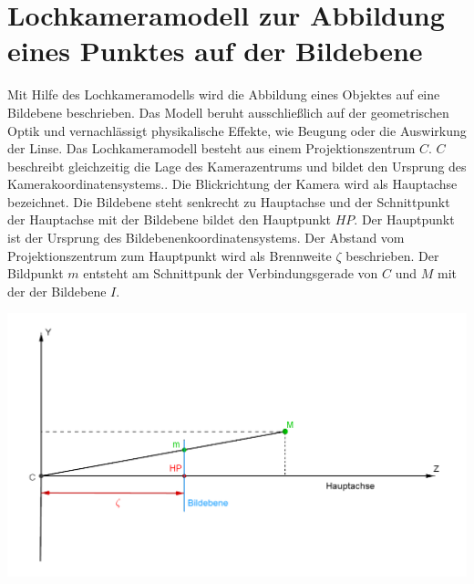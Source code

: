 \section{Lochkameramodell zur Abbildung eines Punktes auf der Bildebene}

Mit Hilfe des Lochkameramodells wird die Abbildung eines Objektes auf eine Bildebene beschrieben. Das Modell beruht ausschließlich auf der geometrischen Optik und vernachlässigt physikalische Effekte, wie Beugung oder die Auswirkung der Linse\cite{Heipke}. Das Lochkameramodell besteht aus einem Projektionszentrum $C$. $C$ beschreibt gleichzeitig die Lage des Kamerazentrums und bildet den Ursprung des Kamerakoordinatensystems.\cite{CamerModels.,HZ}.
Die Blickrichtung der Kamera wird als Hauptachse bezeichnet. Die Bildebene steht senkrecht zu Hauptachse und der Schnittpunkt der Hauptachse mit der Bildebene bildet den Hauptpunkt $HP$. Der Hauptpunkt ist der Ursprung des Bildebenenkoordinatensystems. Der Abstand vom Projektionszentrum zum Hauptpunkt wird als Brennweite $\zeta$ beschrieben\cite{HZ,CamerModels.}. Der Bildpunkt $m$ entsteht am Schnittpunk der Verbindungsgerade von $C$ und $M$ mit der der Bildebene $I$. 

\begin{minipage}{\linewidth}
	\centering
	\includegraphics[width=.8\linewidth]{images/PinholeCameraModell2D.png}
	\label{fig:PinholeCamera2D}
\end{minipage}\\ \\

